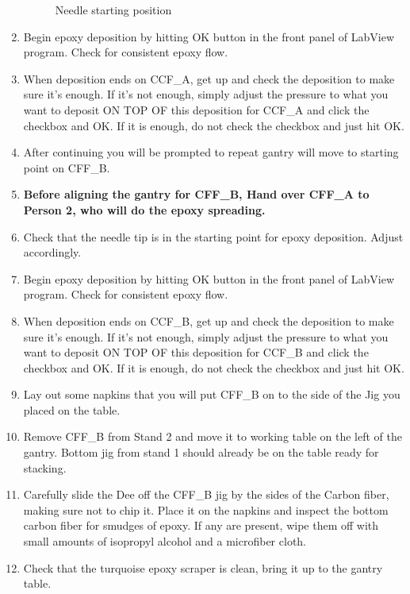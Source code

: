 \documentclass[12pt]{cornelltfpxsop}
\begin{document}
\begin{paracol}{2}
\begin{enumerate}
\begin{figure}[h!]
            \caption{Needle starting position}
            \label{needleref}
        \end{figure}
        \item Begin epoxy deposition by hitting OK button in the front panel of LabView program. Check for consistent epoxy flow. 
        \item When deposition ends on CCF\_A, get up and check the deposition to make sure it's enough. If it's not enough, simply adjust the pressure to what you want to deposit ON TOP OF this deposition for CCF\_A and click the checkbox and OK. If it is enough, do not check the checkbox and just hit OK.
        \item After continuing you will be prompted to repeat  gantry will move to starting point on CFF\_B.  
        \item \textbf{Before aligning the gantry for CFF\_B, Hand over CFF\_A to Person 2, who will do the epoxy spreading.}
        \item Check that the needle tip is in the starting point for epoxy deposition. Adjust accordingly. 
        \item Begin epoxy deposition by hitting OK button in the front panel of LabView program. Check for consistent epoxy flow.
        \item When deposition ends on CCF\_B, get up and check the deposition to make sure it's enough. If it's not enough, simply adjust the pressure to what you want to deposit ON TOP OF this deposition for CCF\_B and click the checkbox and OK. If it is enough, do not check the checkbox and just hit OK.
        \item Lay out some napkins that you will put CFF\_B on to the side of the Jig you placed on the table.
        \item Remove CFF\_B from Stand 2 and move it to working table on the left of the gantry. Bottom jig from stand 1 should already be on the table ready for stacking.
        \item Carefully slide the Dee off the CFF\_B jig by the sides of the Carbon fiber, making sure not to chip it. Place it on the napkins and inspect the bottom carbon fiber for smudges of epoxy. If any are present, wipe them off with small amounts of isopropyl alcohol and a microfiber cloth.
        \item Check that the turquoise epoxy scraper is clean, bring it up to the gantry table.

\end{enumerate}
\end{paracol}
\end{document}
